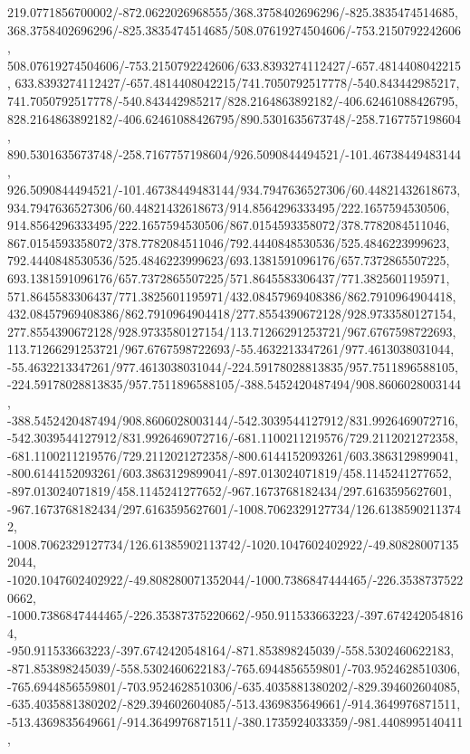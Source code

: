 {    219.0771856700002/-872.0622026968555/368.3758402696296/-825.3835474514685,
    368.3758402696296/-825.3835474514685/508.07619274504606/-753.2150792242606,
    508.07619274504606/-753.2150792242606/633.8393274112427/-657.4814408042215,
    633.8393274112427/-657.4814408042215/741.7050792517778/-540.843442985217,
    741.7050792517778/-540.843442985217/828.2164863892182/-406.62461088426795,
    828.2164863892182/-406.62461088426795/890.5301635673748/-258.7167757198604,
    890.5301635673748/-258.7167757198604/926.5090844494521/-101.46738449483144,
    926.5090844494521/-101.46738449483144/934.7947636527306/60.44821432618673,
    934.7947636527306/60.44821432618673/914.8564296333495/222.1657594530506,
    914.8564296333495/222.1657594530506/867.0154593358072/378.7782084511046,
    867.0154593358072/378.7782084511046/792.4440848530536/525.4846223999623,
    792.4440848530536/525.4846223999623/693.1381591096176/657.7372865507225,
    693.1381591096176/657.7372865507225/571.8645583306437/771.3825601195971,
    571.8645583306437/771.3825601195971/432.08457969408386/862.7910964904418,
    432.08457969408386/862.7910964904418/277.8554390672128/928.9733580127154,
    277.8554390672128/928.9733580127154/113.71266291253721/967.6767598722693,
    113.71266291253721/967.6767598722693/-55.4632213347261/977.4613038031044,
    -55.4632213347261/977.4613038031044/-224.59178028813835/957.7511896588105,
    -224.59178028813835/957.7511896588105/-388.5452420487494/908.8606028003144,
    -388.5452420487494/908.8606028003144/-542.3039544127912/831.9926469072716,
    -542.3039544127912/831.9926469072716/-681.1100211219576/729.2112021272358,
    -681.1100211219576/729.2112021272358/-800.6144152093261/603.3863129899041,
    -800.6144152093261/603.3863129899041/-897.013024071819/458.1145241277652,
    -897.013024071819/458.1145241277652/-967.1673768182434/297.6163595627601,
    -967.1673768182434/297.6163595627601/-1008.7062329127734/126.61385902113742,
    -1008.7062329127734/126.61385902113742/-1020.1047602402922/-49.808280071352044,
    -1020.1047602402922/-49.808280071352044/-1000.7386847444465/-226.35387375220662,
    -1000.7386847444465/-226.35387375220662/-950.911533663223/-397.6742420548164,
    -950.911533663223/-397.6742420548164/-871.853898245039/-558.5302460622183,
    -871.853898245039/-558.5302460622183/-765.6944856559801/-703.9524628510306,
    -765.6944856559801/-703.9524628510306/-635.4035881380202/-829.394602604085,
    -635.4035881380202/-829.394602604085/-513.4369835649661/-914.3649976871511,
    -513.4369835649661/-914.3649976871511/-380.1735924033359/-981.4408995140411,
}
